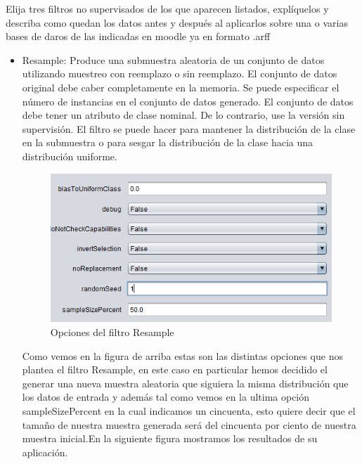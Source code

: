 Elija tres filtros no supervisados de los que aparecen listados, explíquelos y describa como quedan los datos antes y después al aplicarlos sobre una o varias bases de daros de las indicadas en moodle ya en formato .arff
\begin{itemize}
    \item Resample: Produce una submuestra aleatoria de un conjunto de datos utilizando muestreo con reemplazo o sin reemplazo.
El conjunto de datos original debe caber completamente en la memoria. Se puede especificar el número de instancias en el conjunto de datos generado. El conjunto de datos debe tener un atributo de clase nominal. De lo contrario, use la versión sin supervisión. El filtro se puede hacer para mantener la distribución de la clase en la submuestra o para sesgar la distribución de la clase hacia una distribución uniforme.
 \begin{figure}[H]
    \centering
    \includegraphics[width=\textwidth, height=0.8\textwidth]{img/opc_resample.PNG}
    \caption{Opciones del filtro Resample}
\end{figure}
Como vemos en la figura de arriba estas son las distintas opciones que nos plantea el filtro Resample, en este caso en particular hemos decidido el generar una nueva muestra aleatoria que siguiera la misma distribución que los datos de entrada y además tal como vemos en la ultima opción sampleSizePercent en la cual indicamos un cincuenta, esto quiere decir que el tamaño de nuestra muestra generada será del cincuenta por ciento de nuestra muestra inicial.En la siguiente figura mostramos los resultados de su aplicación.

\end{itemize}
